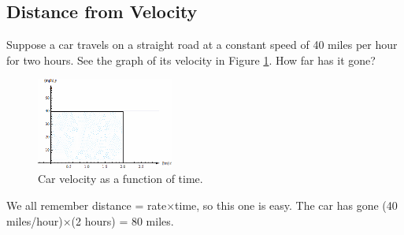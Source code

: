 \subsection{Distance from Velocity}
\begin{example}
Suppose a car travels on a straight road at a constant speed of 40 miles per hour for two hours. See the graph of its velocity in Figure \ref{fig:5-2-distance}. How far has it gone?

\begin{figure}[!ht]
  \centering
    \includegraphics[width=0.4\textwidth]{img/chap5/image001.png}
    \caption{Car velocity as a function of time.}
    \label{fig:5-2-distance}
\end{figure}
\begin{solution}
We all remember distance = rate$\times$time, so this one is easy. The car has gone (40 miles/hour)$\times$(2 hours) = 80 miles.
\end{solution}\end{example}


